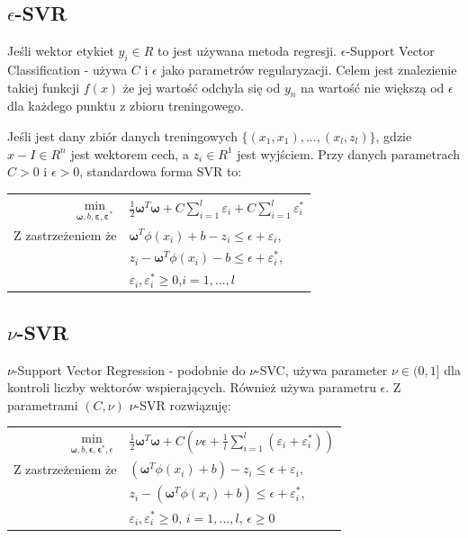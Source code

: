 \documentclass[paper=a4, fontsize=11pt]{scrartcl} %
\numberwithin{equation}{section} %
\numberwithin{figure}{section} %
\begin{document}
\newpage
\subsection{$\epsilon$-SVR}
    \par Jeśli wektor etykiet $y_i \in R$ to jest używana metoda regresji.
    $\epsilon$-Support Vector Classification -  używa $C$ i $\epsilon$ jako
    parametrów regularyzacji. Celem jest znalezienie takiej funkcji $f(x)$
    że jej wartość odchyla się od $y_n$ na wartość nie większą od $\epsilon$
    dla każdego punktu z zbioru treningowego.
    \par Jeśli jest dany zbiór danych treningowych $\{(x_1, x_1),...,
    (x_l, z_l)\}$, gdzie $x-I \in R^n$ jest wektorem cech, a $z_i \in R^1$
    jest wyjściem. Przy danych parametrach $C>0$ i $\epsilon > 0$, standardowa 
    forma SVR to:

    \begin{center}
        \begin{tabular}{rl}
            $\min\limits_{\pmb{\omega},b,\pmb{\varepsilon}, \pmb{\varepsilon}^*}$ &
            $\frac{1}{2}\pmb{\omega}^T\pmb{\omega} + C\sum\limits_{i=1}^{l}
            \varepsilon_i + C\sum\limits_{i=1}^{l}\varepsilon_{i}^{*}$ \\
            Z zastrzeżeniem że & $\pmb{\omega}^T\phi(x_i) + b - z_i \leq \epsilon + \varepsilon_i$, \\
                           & $z_i - \pmb{\omega}^T\phi(x_i) - b \leq  \epsilon + \varepsilon_i^*$, \\
                           & $\varepsilon_i,\varepsilon_i^* \geq 0$,$i=1,...,l$

        \end{tabular}
    \end{center}

\subsection{$\nu$-SVR}
    \par $\nu$-Support Vector Regression - podobnie do $\nu$-SVC, używa parameter $\nu\in(0,1]$
    dla kontroli liczby wektorów wspierających. Również używa parametru $\epsilon$. Z parametrami
    $(C,\nu)$ $\nu$-SVR rozwiązuję:
    
    \begin{center}
        \begin{tabular}{rl}
            $\min\limits_{\pmb{\omega},b,\pmb{\epsilon},\pmb{\epsilon}^*,\epsilon}$ &
            $\frac{1}{2}\pmb{\omega}^T\pmb{\omega} + C(\nu\epsilon + \frac{1}{l}
            \sum\limits_{i=1}^{l}(\varepsilon_i+\varepsilon_i^*))$ \\
            Z zastrzeżeniem że & 
            $(\pmb{\omega}^T\phi(x_i) + b) - z_i \leq \epsilon + \varepsilon_i$,\\
           & $z_i - (\pmb{\omega}^T\phi(x_i) + b) \leq \epsilon + \varepsilon_i^*$,\\
           & $\varepsilon_i,\varepsilon_i^* \geq 0$, $i=1,...,l$, $\epsilon \geq 0$
        \end{tabular}
    \end{center}
\end{document}
